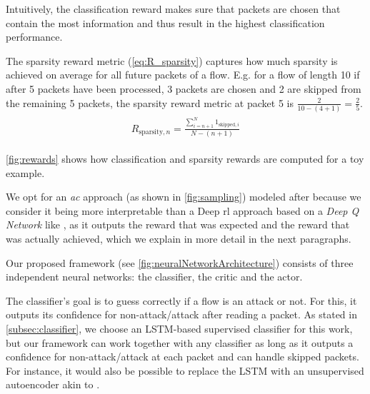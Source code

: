 \documentclass[conference]{IEEEtran}
\newcommand\note[2]{{\color{#1}#2}}
\begin{document}
Intuitively, the classification reward makes sure that packets are chosen that contain the most information and thus result in the highest classification performance.

The sparsity reward metric (\autoref{eq:R_sparsity}) captures how much sparsity is achieved on average for all future packets of a flow. E.g. for a flow of length 10 if after 5 packets have been processed, 3 packets are chosen and 2 are skipped from the remaining 5 packets, the sparsity reward metric at packet 5 is $\frac{2}{10-(4+1)}=\frac{2}{5}$.
\begin{align}
\begin{split}
R_{\text{sparsity},n} = \frac{\sum_{i=n+1}^{N} 1_{\text{skipped},i}}{N-(n+1)}
\end{split}
\label{eq:R_sparsity}
\end{align}

\autoref{fig:rewards} shows how classification and sparsity rewards are computed for a toy example.

We opt for an \emph{\gls{ac}} approach (as shown in \autoref{fig:sampling}) modeled after \cite{mnih_asynchronous_2016} because we consider it being more interpretable than a Deep \gls{rl} approach based on a \textit{Deep Q Network} like \cite{mnih_playing_2013}, as it outputs the reward that was expected and the reward that was actually achieved, which we explain in more detail in the next paragraphs.

Our proposed framework (see \autoref{fig:neuralNetworkArchitecture}) consists of three independent neural networks: the classifier, the critic and the actor.

The classifier's goal is to guess correctly if a flow is an attack or not. For this, it outputs its confidence for non-attack/attack after reading a packet. As stated in \autoref{subsec:classifier}, we choose an LSTM-based supervised classifier for this work, but our framework can work together with any classifier as long as it outputs a confidence for non-attack/attack at each packet and can handle skipped packets. For instance, it would also be possible to replace the LSTM with an unsupervised autoencoder akin to \cite{mirsky_kitsune_2018}.
\end{document}
